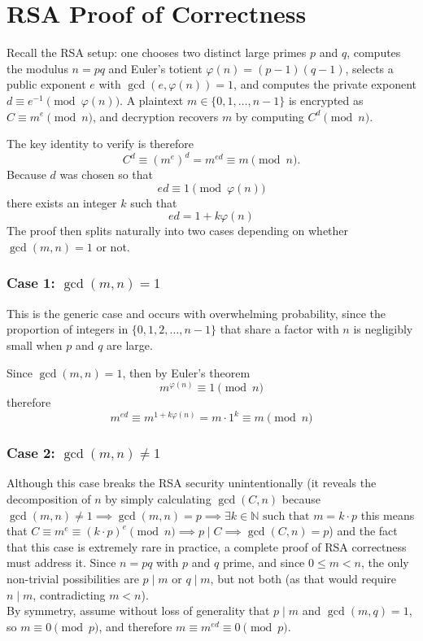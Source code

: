 \section{RSA Proof of Correctness}

Recall the RSA setup: one chooses two distinct large primes $p$ and $q$, computes the modulus $n = pq$ and Euler's totient $\varphi(n) = (p-1)(q-1)$,
selects a public exponent $e$ with $\gcd(e,\varphi(n))=1$, and computes the private
exponent $d \equiv e^{-1} \pmod{\varphi(n)}$. A plaintext $m \in \{0,1,\ldots,n-1\}$
is encrypted as $ C \equiv m^e \pmod{n}$, and decryption recovers $m$ by computing
$C^d \pmod{n}$.

The key identity to verify is therefore
\[
  C^d \equiv (m^e)^d = m^{ed} \equiv m \pmod{n}.
\]
Because $d$ was chosen so that \[ ed \equiv 1 \pmod{\varphi(n)}
\]
 there exists an integer
$k$ such that
\[ed = 1 + k\varphi(n)\]
The proof then splits naturally into two cases
depending on whether $\gcd(m,n)=1$ or not.


\subsubsection*{Case 1: $\gcd(m, n) = 1$}

This is the generic case and occurs with overwhelming probability, since the proportion of integers in $\{0,1,2,\ldots,n-1\}$ that share a factor
with $n$ is negligibly small when $p$ and $q$ are large.


Since $\gcd(m,n)=1$, then by Euler's theorem 
\[m^{\varphi(n)} \equiv 1 \pmod{n}\]
therefore
\[
  m^{ed} \equiv m^{1 + k\varphi(n)} = m \cdot 1^k \equiv m\pmod{n} 
\]

\subsubsection*{Case 2: $\gcd(m, n) \neq 1$}

Although this case breaks the RSA security unintentionally (it reveals the decomposition of $n$ by simply calculating $\gcd(C,n)$ because $\gcd(m,n) \neq 1 \implies \gcd(m,n) = p \implies \exists k \in \mathbb{N} \text{ such that }m = k \cdot p $ this means that $C \equiv m^e \equiv (k \cdot p)^e \pmod{n} \implies p \mid C \implies \gcd(C,n)=p $) and the fact that this case is extremely rare in practice, a complete proof of RSA correctness must address it. Since $n = pq$ with
$p$ and $q$ prime, and since $0 \leq m < n$, the only non-trivial possibilities are
$p \mid m$ or $q \mid m$, but not both (as that would require $n \mid m$, contradicting
$m < n$). 
\\By symmetry, assume without loss of generality that $p \mid m$ and
$\gcd(m,q)=1$, so $m \equiv 0 \pmod{p}$, and therefore
$m \equiv m^{ed} \equiv 0 \pmod{p}$.

